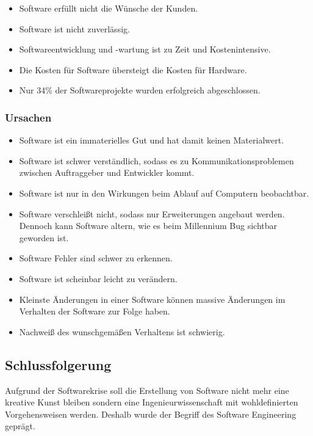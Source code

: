 \documentclass[../main.tex]{subfiles}
\begin{document}
            \begin{itemize}
                \item Software erfüllt nicht die Wünsche der Kunden.
                \item Software ist nicht zuverlässig.
                \item Softwareentwicklung und -wartung ist zu Zeit und Kostenintensive.
                \item Die Kosten für Software übersteigt die Kosten für Hardware.
                \item Nur 34\% der Softwareprojekte wurden erfolgreich abgeschlossen.
            \end{itemize}
            
            \subsubsection{Ursachen}
                \begin{itemize}
                    \item Software ist ein immaterielles Gut und hat damit keinen Materialwert.
                    \item Software ist schwer verständlich, sodass es zu Kommunikationsproblemen zwischen Auftraggeber und Entwickler kommt.
                    \item Software ist nur in den Wirkungen beim Ablauf auf Computern beobachtbar.
                    \item Software verschleißt nicht, sodass nur Erweiterungen angebaut werden. Dennoch kann Software altern, wie es beim Millennium Bug sichtbar geworden ist.
                    \item Software Fehler sind schwer zu erkennen.
                    \item Software ist scheinbar leicht zu verändern.
                    \item Kleinste Änderungen in einer Software können massive Änderungen im Verhalten der Software zur Folge haben.
                    \item Nachweiß des wunschgemäßen Verhaltens ist schwierig.
                \end{itemize}
                
            \subsection{Schlussfolgerung}
                Aufgrund der Softwarekrise soll die Erstellung von Software nicht mehr eine kreative Kunst bleiben sondern eine Ingenieurwissenschaft mit wohldefinierten Vorgehensweisen werden. Deshalb wurde der Begriff des Software Engineering geprägt.
                
\end{document}
